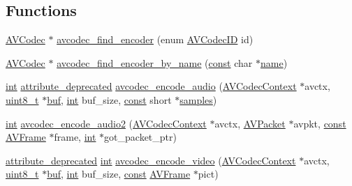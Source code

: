 \subsection*{Functions}
\begin{DoxyCompactItemize}
\item 
\hyperlink{struct_a_v_codec}{A\+V\+Codec} $\ast$ \hyperlink{group__lavc__encoding_ga9f820c481615c3a02d0407bac0bdbf25}{avcodec\+\_\+find\+\_\+encoder} (enum \hyperlink{group__lavc__core_gaadca229ad2c20e060a14fec08a5cc7ce}{A\+V\+Codec\+ID} id)
\item 
\hyperlink{struct_a_v_codec}{A\+V\+Codec} $\ast$ \hyperlink{group__lavc__encoding_gaa614ffc38511c104bdff4a3afa086d37}{avcodec\+\_\+find\+\_\+encoder\+\_\+by\+\_\+name} (\hyperlink{getopt1_8c_a2c212835823e3c54a8ab6d95c652660e}{const} char $\ast$\hyperlink{lib_2expat_8h_a1b49b495b59f9e73205b69ad1a2965b0}{name})
\item 
\hyperlink{xmltok_8h_a5a0d4a5641ce434f1d23533f2b2e6653}{int} \hyperlink{attributes_8h_aa6d076561d3a9eea4729ee632652de02}{attribute\+\_\+deprecated} \hyperlink{group__lavc__encoding_gaf12a9da0d33f50ff406e03572fab4763}{avcodec\+\_\+encode\+\_\+audio} (\hyperlink{struct_a_v_codec_context}{A\+V\+Codec\+Context} $\ast$avctx, \hyperlink{lib-src_2ffmpeg_2win32_2stdint_8h_a9a941819355e6f658991890ff66b4b0e}{uint8\+\_\+t} $\ast$\hyperlink{xlstr_8c_a781718f5b53a876fe91c424c4607fa8f}{buf}, \hyperlink{xmltok_8h_a5a0d4a5641ce434f1d23533f2b2e6653}{int} buf\+\_\+size, \hyperlink{getopt1_8c_a2c212835823e3c54a8ab6d95c652660e}{const} short $\ast$\hyperlink{test__w__saw8_8c_a54185623a5a093f671a73e5fba6197a1}{samples})
\item 
\hyperlink{xmltok_8h_a5a0d4a5641ce434f1d23533f2b2e6653}{int} \hyperlink{group__lavc__encoding_ga93a49fbd0973b216dcb8a8c5dffe1d82}{avcodec\+\_\+encode\+\_\+audio2} (\hyperlink{struct_a_v_codec_context}{A\+V\+Codec\+Context} $\ast$avctx, \hyperlink{struct_a_v_packet}{A\+V\+Packet} $\ast$avpkt, \hyperlink{getopt1_8c_a2c212835823e3c54a8ab6d95c652660e}{const} \hyperlink{struct_a_v_frame}{A\+V\+Frame} $\ast$frame, \hyperlink{xmltok_8h_a5a0d4a5641ce434f1d23533f2b2e6653}{int} $\ast$got\+\_\+packet\+\_\+ptr)
\item 
\hyperlink{attributes_8h_aa6d076561d3a9eea4729ee632652de02}{attribute\+\_\+deprecated} \hyperlink{xmltok_8h_a5a0d4a5641ce434f1d23533f2b2e6653}{int} \hyperlink{group__lavc__encoding_ga22847c21918ee93a4d05f7ffb419f9a9}{avcodec\+\_\+encode\+\_\+video} (\hyperlink{struct_a_v_codec_context}{A\+V\+Codec\+Context} $\ast$avctx, \hyperlink{lib-src_2ffmpeg_2win32_2stdint_8h_a9a941819355e6f658991890ff66b4b0e}{uint8\+\_\+t} $\ast$\hyperlink{xlstr_8c_a781718f5b53a876fe91c424c4607fa8f}{buf}, \hyperlink{xmltok_8h_a5a0d4a5641ce434f1d23533f2b2e6653}{int} buf\+\_\+size, \hyperlink{getopt1_8c_a2c212835823e3c54a8ab6d95c652660e}{const} \hyperlink{struct_a_v_frame}{A\+V\+Frame} $\ast$pict)

\end{DoxyCompactItemize}
